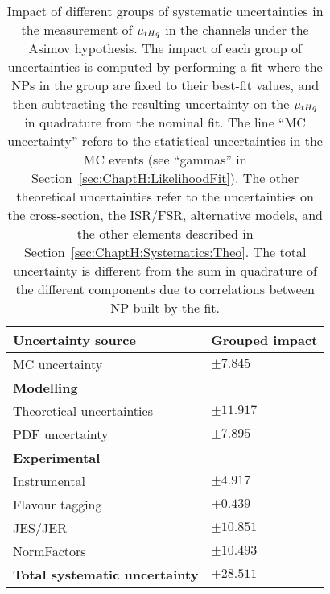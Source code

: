 \begin{table}[h] %
\centering
\begin{tabular}{l|l}
\toprule
\textbf{Uncertainty source}	& Grouped impact		\\
\midrule
MC uncertainty				& $\pm 7.845$	\\
\midrule
\textbf{Modelling}			&            			\\
Theoretical uncertainties		& $\pm 11.917$	\\
PDF uncertainty			& $\pm 7.895$\\
\midrule
\textbf{Experimental}			&				\\
Instrumental				& $\pm 4.917$	\\
Flavour tagging				& $\pm 0.439$	\\
JES/JER					& $\pm 10.851$	\\
\midrule
NormFactors				& $\pm 10.493$	\\
\midrule
\textbf{Total systematic uncertainty} & $\pm 28.511$\\
\bottomrule   
\end{tabular}
\caption{Impact of different groups of systematic uncertainties in the measurement 
of $\mu_{tHq}$ in the \dilepOStau channels under the Asimov hypothesis. 
The impact of each group of uncertainties is computed 
by performing a fit where the NPs in the group are fixed to their best-fit values, and then subtracting the resulting 
uncertainty on the $\mu_{tHq}$ in quadrature from the nominal fit. The line ``MC uncertainty'' refers to the statistical 
uncertainties in the MC events (see ``gammas'' in Section~\ref{sec:ChaptH:LikelihoodFit}).
The other theoretical uncertainties refer to the uncertainties on the cross-section, the ISR/FSR, alternative models, and
the other elements described in Section~\ref{sec:ChaptH:Systematics:Theo}.
The total uncertainty is different from the sum in quadrature of the different components due to correlations between
NP built by the fit.}
\label{tab:ChaptH:Asimov:OS:GroupedSyst}
\end{table}



